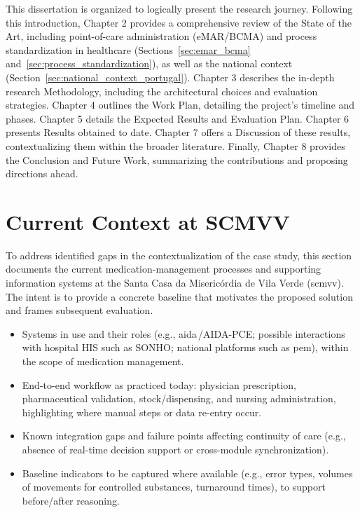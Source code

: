 This dissertation is organized to logically present the research journey. Following this introduction, Chapter 2 provides a comprehensive review of the State of the Art, including point-of-care administration (eMAR/BCMA) and process standardization in healthcare (Sections~\ref{sec:emar_bcma} and~\ref{sec:process_standardization}), as well as the national context (Section~\ref{sec:national_context_portugal}). Chapter 3 describes the in-depth research Methodology, including the architectural choices and evaluation strategies. Chapter 4 outlines the Work Plan, detailing the project's timeline and phases. Chapter 5 details the Expected Results and Evaluation Plan. Chapter 6 presents Results obtained to date. Chapter 7 offers a Discussion of these results, contextualizing them within the broader literature. Finally, Chapter 8 provides the Conclusion and Future Work, summarizing the contributions and proposing directions ahead. 

\section{Current Context at SCMVV}
\label{sec:context_scmvv}

To address identified gaps in the contextualization of the case study, this section documents the current medication-management processes and supporting information systems at the Santa Casa da Misericórdia de Vila Verde (\gls{scmvv}). The intent is to provide a concrete baseline that motivates the proposed solution and frames subsequent evaluation.

\begin{itemize}
    \item Systems in use and their roles (e.g., \gls{aida}\,/AIDA-PCE; possible interactions with hospital HIS such as SONHO; national platforms such as \gls{pem}), within the scope of medication management.
    \item End-to-end workflow as practiced today: physician prescription, pharmaceutical validation, stock/dispensing, and nursing administration, highlighting where manual steps or data re-entry occur.
    \item Known integration gaps and failure points affecting continuity of care (e.g., absence of real-time decision support or cross-module synchronization).
    \item Baseline indicators to be captured where available (e.g., error types, volumes of movements for controlled substances, turnaround times), to support before/after reasoning.
\end{itemize}


